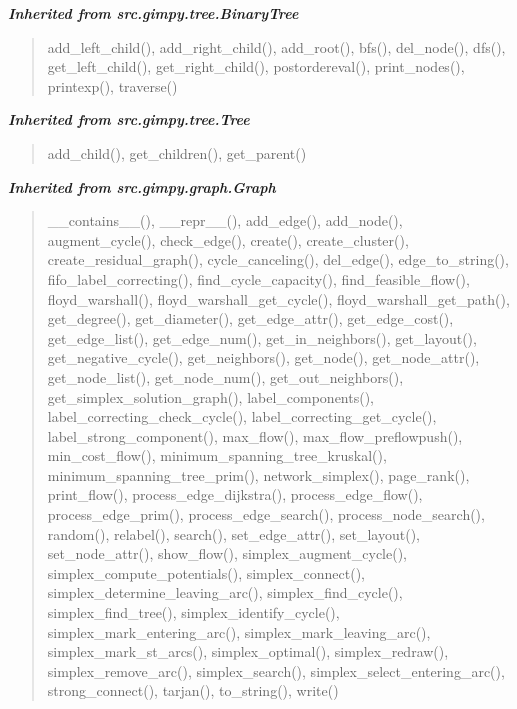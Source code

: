 \large{\textbf{\textit{Inherited from src.gimpy.tree.BinaryTree}}}

\begin{quote}
add\_left\_child(), add\_right\_child(), add\_root(), bfs(), del\_node(), dfs(), get\_left\_child(), get\_right\_child(), postordereval(), print\_nodes(), printexp(), traverse()
\end{quote}

\large{\textbf{\textit{Inherited from src.gimpy.tree.Tree}}}

\begin{quote}
add\_child(), get\_children(), get\_parent()
\end{quote}

\large{\textbf{\textit{Inherited from src.gimpy.graph.Graph}}}

\begin{quote}
\_\_contains\_\_(), \_\_repr\_\_(), add\_edge(), add\_node(), augment\_cycle(), check\_edge(), create(), create\_cluster(), create\_residual\_graph(), cycle\_canceling(), del\_edge(), edge\_to\_string(), fifo\_label\_correcting(), find\_cycle\_capacity(), find\_feasible\_flow(), floyd\_warshall(), floyd\_warshall\_get\_cycle(), floyd\_warshall\_get\_path(), get\_degree(), get\_diameter(), get\_edge\_attr(), get\_edge\_cost(), get\_edge\_list(), get\_edge\_num(), get\_in\_neighbors(), get\_layout(), get\_negative\_cycle(), get\_neighbors(), get\_node(), get\_node\_attr(), get\_node\_list(), get\_node\_num(), get\_out\_neighbors(), get\_simplex\_solution\_graph(), label\_components(), label\_correcting\_check\_cycle(), label\_correcting\_get\_cycle(), label\_strong\_component(), max\_flow(), max\_flow\_preflowpush(), min\_cost\_flow(), minimum\_spanning\_tree\_kruskal(), minimum\_spanning\_tree\_prim(), network\_simplex(), page\_rank(), print\_flow(), process\_edge\_dijkstra(), process\_edge\_flow(), process\_edge\_prim(), process\_edge\_search(), process\_node\_search(), random(), relabel(), search(), set\_edge\_attr(), set\_layout(), set\_node\_attr(), show\_flow(), simplex\_augment\_cycle(), simplex\_compute\_potentials(), simplex\_connect(), simplex\_determine\_leaving\_arc(), simplex\_find\_cycle(), simplex\_find\_tree(), simplex\_identify\_cycle(), simplex\_mark\_entering\_arc(), simplex\_mark\_leaving\_arc(), simplex\_mark\_st\_arcs(), simplex\_optimal(), simplex\_redraw(), simplex\_remove\_arc(), simplex\_search(), simplex\_select\_entering\_arc(), strong\_connect(), tarjan(), to\_string(), write()
\end{quote}

